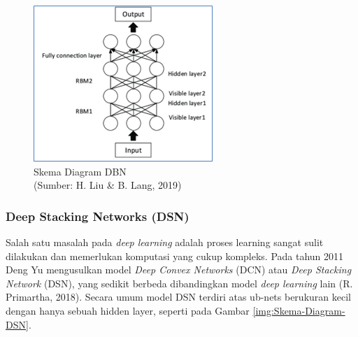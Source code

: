 \begin{figure}[H]
	\vspace{-0.1cm}
	\begin{center}
		\includegraphics[width=0.6\columnwidth]{bab2/Gambar/Picture27.png}
	\end{center}
	\vspace{-0.2cm}
	\captionsetup{justification=centering}
	\caption{Skema Diagram DBN\\(Sumber: H. Liu {\&} B. Lang, 2019)}\label{img:Skema-Diagram-DBN}
\end{figure}

\subsubsection{Deep Stacking Networks (DSN)}
\hspace{1,2cm}Salah satu masalah pada \textit{deep learning} adalah proses learning sangat sulit dilakukan dan memerlukan komputasi yang cukup kompleks. Pada tahun 2011 Deng Yu mengusulkan model \textit{Deep Convex Networks} (DCN) atau \textit{Deep Stacking Network} (DSN), yang sedikit berbeda dibandingkan model \textit{deep learning} lain (R. Primartha, 2018). Secara umum model DSN terdiri atas ub-nets berukuran kecil dengan hanya sebuah hidden layer, seperti pada Gambar \ref{img:Skema-Diagram-DSN}.

